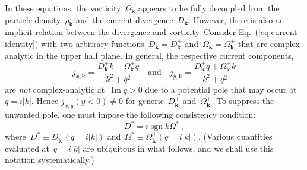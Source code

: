 \documentclass[preprint,aps,eqsecnum, prb]{revtex4-1}
\newcommand{\fplus}[1]{{#1}^{+}}
\renewcommand{\Im}{\mathop{\mathrm{Im}}\nolimits}
\newcommand{\sgn}{\mathop{\mathrm{sgn}}\nolimits}
\begin{document}
In these equations, the vorticity~$\Omega_{\bm k}$ appears to be fully
decoupled from the particle density~$\rho_{\bm k}$
and the current divergence~$D_{\bm k}$. However, there is also an implicit
relation between the divergence and vorticity. Consider
Eq.~(\ref{eq:current-identity}) with two arbitrary
functions~$D_{\bm k} = \fplus{D}_{\bm k}$
 and~$\Omega_{\bm k} = \fplus{\Omega}_{\bm k}$ that are complex-analytic
 in the upper half plane. In general, the respective current components,
\begin{equation}
\label{eq:jxy}
  j_{x, {\bm k}} = \frac{\fplus{D}_{\bm k} k - \fplus{\Omega}_{\bm k} q}{k^2 + q^2}
  \quad \mathrm{and}
  \quad
  j_{y, {\bm k}} = \frac{\fplus{D}_{\bm k} q  + \fplus{\Omega}_{\bm k} k}{k^2 + q^2}
\end{equation}
are \textit{not} complex-analytic at~$\Im q > 0$ due to a potential
pole that may occur at~$q = i |k|$. Hence $j_{x, y}(y < 0) \neq 0$
for generic~$\fplus{D}_{\bm k}$ and~$\fplus{\Omega}_{\bm k}$.
To suppress the unwanted pole, one must impose
the following consistency condition:
\begin{equation}
  \label{eq:consistency-D-Omega}
  D^\ast = i \sgn k \Omega^\ast
\ ,
\end{equation}
where~$D^\ast \equiv \fplus{D}_{\bm k} (q = i |k|)$
and~$\Omega^\ast \equiv \fplus{\Omega}_{\bm k} (q = i |k|)$.
(Various quantities evaluated at~$q = i |k|$ are ubiquitous in what follows,
and we shall use this notation systematically.)
\end{document}
